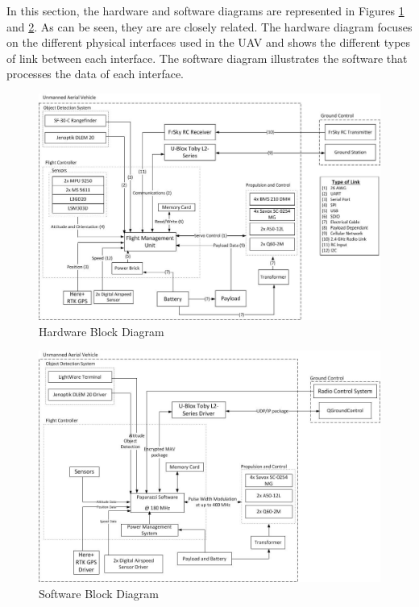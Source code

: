 In this section, the hardware and software diagrams are represented in Figures \ref{fig:hwdia} and \ref{fig:swdia}. As can be seen, they are are closely related. The hardware diagram focuses on the different physical interfaces used in the UAV and shows the different types of link between each interface. The software diagram illustrates the software that processes the data of each interface. 

\begin{figure}[ht]
    \centering
    \includegraphics[width=.7\textwidth]{./CommandDataHandling/Figures/HWdiagram.jpg}
    \caption{Hardware Block Diagram}
    \label{fig:hwdia}
\end{figure}

\begin{figure}[ht]
    \centering
    \includegraphics[width=.7\textwidth]{./CommandDataHandling/Figures/SWdiagram.jpg}
    \caption{Software Block Diagram}
    \label{fig:swdia}
\end{figure}


